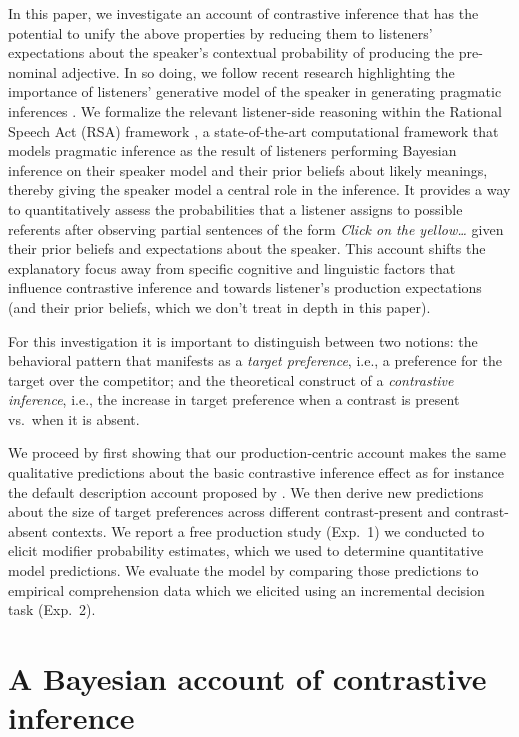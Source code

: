 \documentclass[10pt,letterpaper]{article}
\begin{document}
In this paper, we investigate an account of contrastive inference that has the potential to unify the above properties by reducing them to listeners' expectations about the speaker's contextual probability of producing the pre-nominal adjective. In so doing, we follow recent research highlighting the importance of listeners' generative model of the speaker in generating pragmatic inferences \cite{Hawkins:2018,Kao:2015,Kleinschmidt:2011,Macdonald:1994,Mitchell:1995,Rubio-Fernandez:2018}. We formalize the relevant listener-side reasoning within the Rational Speech Act (RSA) framework \cite{Frank:2012, Goodman:2016, Cohn-Gordon:2019}, a state-of-the-art computational framework that models pragmatic inference as the result of listeners performing Bayesian inference on their speaker model and their prior beliefs about likely meanings, thereby giving the speaker model a central role in the inference. It provides a way to quantitatively assess the probabilities that a listener assigns to possible referents after observing partial sentences of the form \emph{Click on the yellow\dots} given their prior beliefs and expectations about the speaker. This account shifts the explanatory focus away from specific cognitive and linguistic factors that influence contrastive inference and towards listener's production expectations (and their prior beliefs, which we don't treat in depth in this paper).

For this investigation it is important to distinguish between two notions: the behavioral pattern that manifests as a \emph{target preference}, i.e., a preference for the target over the competitor; and the theoretical construct of a \emph{contrastive inference}, i.e., the increase in target preference when a contrast is present vs.~when it is absent.

We proceed by first showing that our production-centric account makes the same qualitative predictions about the basic contrastive inference effect as for instance the default description account proposed by . We then derive new predictions about the size of target preferences across different contrast-present and contrast-absent contexts. We report a free production study (Exp.~1) we conducted to elicit modifier probability estimates, which we used to determine quantitative model predictions. We evaluate the model by comparing those predictions to empirical comprehension data which we elicited using an incremental decision task (Exp.~2).


\section{A Bayesian account of contrastive inference}
\end{document}
